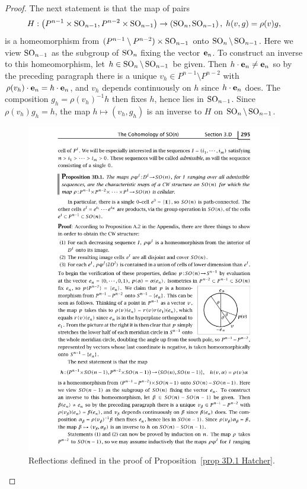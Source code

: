 \begin{proof}
    The next statement is that the map of pairs
    \[H:\left(P^{n-1}\times\SO_{n-1},P^{n-2}\times\SO_{n-1}\right)\to \left(\SO_n,\SO_{n-1}\right),\;h(v,g)=\rho(v)g,\]
    is a homeomorphism from $(P^{n-1}\setminus P^{n-2})\times\SO_{n-1}$ onto $\SO_n\setminus\SO_{n-1}$. Here we view $\SO_{n-1}$ as the subgroup of $\SO_n$ fixing the vector $\bf{e}_n$. To construct an inverse to this homeomorphism, let $h\in\SO_n\setminus \SO_{n-1}$ be given. Then $h\cdot \bf{e}_n\neq \bf{e}_n$ so by the preceding paragraph there is a unique $v_h\in P^{n-1}\setminus P^{n-2}$ with $\rho(v_h)\cdot \bf{e}_n=h\cdot \bf{e}_n$, and $v_h$ depends continuously on $h$ since $h\cdot \bf{e}_n$ does. The composition $g_h=\rho(v_h)^{-1}h$ then fixes $h$, hence lies in $\SO_{n-1}$. Since $\rho(v_h)g_h=h$, the map $h\mapsto (v_h,g_h)$ is an inverse to $H$ on $\SO_n\setminus\SO_{n-1}$.
    \begin{figure}[tp]
        \centering
        \includegraphics[scale=0.7]{figures/CW_SOn.pdf}
        \caption{Reflections defined in the proof of Proposition~\ref{prop 3D.1 Hatcher}.}
        \label{fig:CW_SOn}
    \end{figure}
    

\end{proof}
